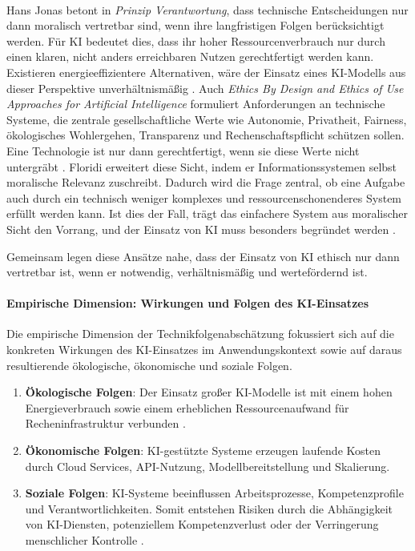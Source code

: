 \paragraph{}

Hans Jonas betont in \textit{Prinzip Verantwortung}, dass technische Entscheidungen nur dann moralisch vertretbar sind, wenn ihre langfristigen Folgen berücksichtigt werden. Für KI bedeutet dies, dass ihr hoher Ressourcenverbrauch nur durch einen klaren, nicht anders erreichbaren Nutzen gerechtfertigt werden kann. Existieren energieeffizientere Alternativen, wäre der Einsatz eines KI-Modells aus dieser Perspektive unverhältnismäßig \cite{jonasPrinzipVerantwortungVersuch1990}. Auch \textit{Ethics By Design and Ethics of Use  Approaches for Artificial Intelligence} formuliert Anforderungen an technische Systeme, die zentrale gesellschaftliche Werte wie Autonomie, Privatheit, Fairness, ökologisches Wohlergehen, Transparenz und Rechenschaftspflicht schützen sollen. Eine Technologie ist nur dann gerechtfertigt, wenn sie diese Werte nicht untergräbt \cite{moenigEthicsDesignGrundlagen2025}. Floridi erweitert diese Sicht, indem er Informationssystemen selbst moralische Relevanz zuschreibt. Dadurch wird die Frage zentral, ob eine Aufgabe auch durch ein technisch weniger komplexes und ressourcenschonenderes System erfüllt werden kann. Ist dies der Fall, trägt das einfachere System aus moralischer Sicht den Vorrang, und der Einsatz von KI muss besonders begründet werden \cite{floridiEthicsInformation2015}.

Gemeinsam legen diese Ansätze nahe, dass der Einsatz von KI ethisch nur dann vertretbar ist, wenn er notwendig, verhältnismäßig und wertefördernd ist.

\paragraph{Empirische Dimension: Wirkungen und Folgen des KI-Einsatzes}

Die empirische Dimension der Technikfolgenabschätzung fokussiert sich auf die konkreten Wirkungen des KI-Einsatzes im Anwendungskontext sowie auf daraus resultierende ökologische, ökonomische und soziale Folgen.

\begin{enumerate}[noitemsep,topsep=5pt]
    \item \textbf{Ökologische Folgen}: Der Einsatz großer KI-Modelle ist mit einem hohen Energieverbrauch sowie einem erheblichen Ressourcenaufwand für Recheninfrastruktur verbunden \cite{EnergyAI2025}.
    \item \textbf{Ökonomische Folgen}: KI-gestützte Systeme erzeugen laufende Kosten durch Cloud Services, API-Nutzung, Modellbereitstellung und Skalierung.
    \item \textbf{Soziale Folgen}: KI-Systeme beeinflussen Arbeitsprozesse, Kompetenzprofile und Verantwortlichkeiten. Somit entstehen Risiken durch die Abhängigkeit von KI-Diensten, potenziellem Kompetenzverlust oder der Verringerung menschlicher Kontrolle \cite{matuenyIllusionCompetenceSkill2025, grunwaldTechnikfolgenabschaetzungEinfuehrung2025}.
\end{enumerate}


